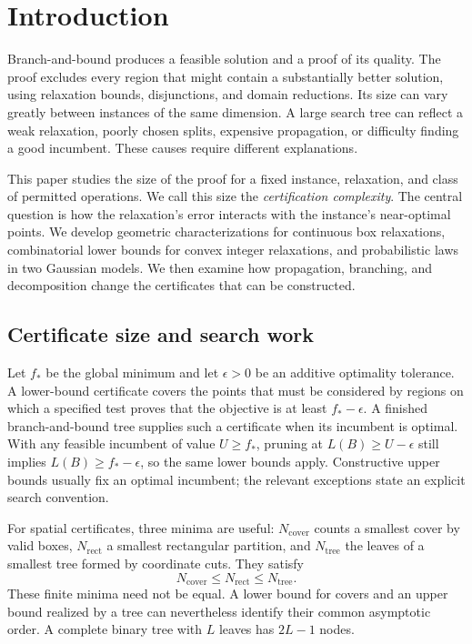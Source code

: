 \section{Introduction}\label{sec:introduction}

Branch-and-bound produces a feasible solution and a proof of its quality.
The proof excludes every region that might contain a substantially better
solution, using relaxation bounds, disjunctions, and domain reductions. Its
size can vary greatly between instances of the same dimension. A large
search tree can reflect a weak relaxation, poorly chosen splits, expensive
propagation, or difficulty finding a good incumbent. These causes require
different explanations.

This paper studies the size of the proof for a fixed instance, relaxation,
and class of permitted operations. We call this size the
\emph{certification complexity}. The central question is how the
relaxation's error interacts with the instance's near-optimal points.
We develop geometric characterizations for continuous box relaxations,
combinatorial lower bounds for convex integer relaxations, and probabilistic
laws in two Gaussian models. We then examine how propagation, branching,
and decomposition change the certificates that can be constructed.

\subsection{Certificate size and search work}\label{intro:certificates}

Let $f_*$ be the global minimum and let $\epsilon>0$ be an additive
optimality tolerance. A lower-bound certificate covers the points that must
be considered by regions on which a specified test proves that the objective
is at least $f_*-\epsilon$. A finished branch-and-bound tree supplies such a
certificate when its incumbent is optimal. With any feasible incumbent of
value $U\geq f_*$, pruning at $L(B)\geq U-\epsilon$ still implies
$L(B)\geq f_*-\epsilon$, so the same lower bounds apply. Constructive upper
bounds usually fix an optimal incumbent; the relevant exceptions state an
explicit search convention.

For spatial certificates, three minima are useful:
$N_{\mathrm{cover}}$ counts a smallest cover by valid boxes,
$N_{\mathrm{rect}}$ a smallest rectangular partition, and
$N_{\mathrm{tree}}$ the leaves of a smallest tree formed by coordinate
cuts. They satisfy
\[
 N_{\mathrm{cover}}\leq N_{\mathrm{rect}}\leq N_{\mathrm{tree}}.
\]
These finite minima need not be equal. A lower bound for covers and an upper
bound realized by a tree can nevertheless identify their common asymptotic
order. A complete binary tree with $L$ leaves has $2L-1$ nodes.


